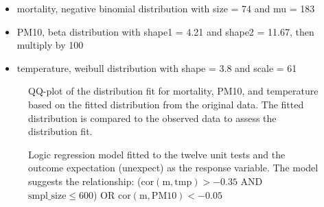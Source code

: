 \documentclass[
]{jds}
\providecommand{\tightlist}{%
  \setlength{\itemsep}{0pt}\setlength{\parskip}{0pt}}\usepackage{longtable,booktabs,array}
\begin{document}
\begin{itemize}
\tightlist
\item
  mortality, negative binomial distribution with size = 74 and mu = 183
\item
  PM10, beta distribution with shape1 = 4.21 and shape2 = 11.67, then
  multiply by 100
\item
  temperature, weibull distribution with shape = 3.8 and scale = 61
\end{itemize}

\label{cell-fig-dist-fit}
\begin{figure}[H]


\caption{\label{fig-dist-fit}QQ-plot of the distribution fit for
mortality, PM10, and temperature based on the fitted distribution from
the original data. The fitted distribution is compared to the observed
data to assess the distribution fit.}

\end{figure}%

\begin{figure}


\caption{\label{fig-linear-reg-tree}Logic regression model fitted to the
twelve unit tests and the outcome expectation (unexpect) as the response
variable. The model suggests the relationship:
(\(\text{cor}(\text{m}, \text{tmp}) > -0.35\) AND
\(\text{smpl\_size} \le 600\)) OR
\(\text{cor}(\text{m},  \text{PM10}) < - 0.05\)}

\end{figure}%
\end{document}
